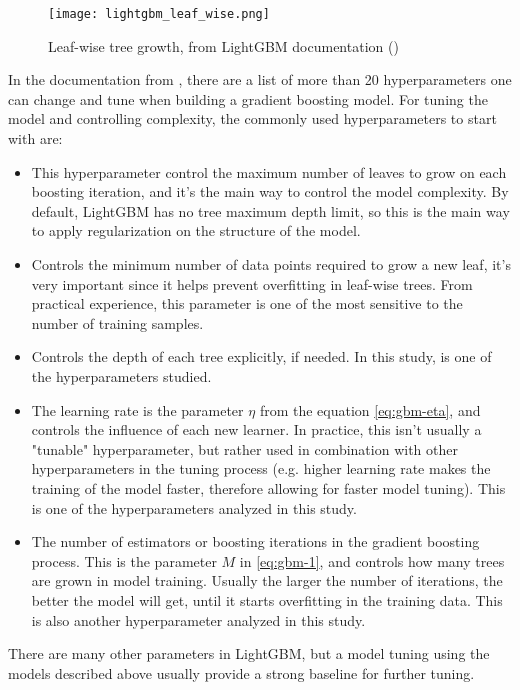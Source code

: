 \begin{figure}[!h]
    \centering
    \texttt{[image: lightgbm\_leaf\_wise.png]} 
    \caption{Leaf-wise tree growth, from LightGBM documentation (\cite{lightgbmparams})}
    \label{fig:lightgbm-grow} 
  \end{figure}

In the documentation from \cite{lightgbmparams}, there are a list of more than 20 hyperparameters one can change and tune when building a gradient boosting model. For tuning the model and controlling complexity, the commonly used hyperparameters to start with are:

\begin{itemize}

    \item \textbf{}
    
    This hyperparameter control the maximum number of leaves to grow on each boosting iteration, and it's the main way to control the model complexity. By default, LightGBM has no tree maximum depth limit, so this is the main way to apply regularization on the structure of the model. 

    \item \textbf{}
    
    Controls the minimum number of data points required to grow a new leaf, it's very important since it helps prevent overfitting in leaf-wise trees. From practical experience, this parameter is one of the most sensitive to the number of training samples.

    \item \textbf{}
    
    Controls the depth of each tree explicitly, if needed. In this study,  is one of the hyperparameters studied.

    \item \textbf{}
    
    The learning rate is the parameter $\eta$ from the equation \ref{eq:gbm-eta}, and controls the influence of each new learner. In practice, this isn't usually a "tunable" hyperparameter, but rather used in combination with other hyperparameters in the tuning process (e.g. higher learning rate makes the training of the model faster, therefore allowing for faster model tuning). This is one of the hyperparameters analyzed in this study. 

   \item \textbf{}
   
   The number of estimators or boosting iterations in the gradient boosting process. This is the parameter $M$ in \ref{eq:gbm-1}, and controls how many trees are grown in model training. Usually the larger the number of iterations, the better the model will get, until it starts overfitting in the training data. This is also another hyperparameter analyzed in this study.

\end{itemize}

There are many other parameters in LightGBM, but a model tuning using the models described above usually provide a strong baseline for further tuning.
